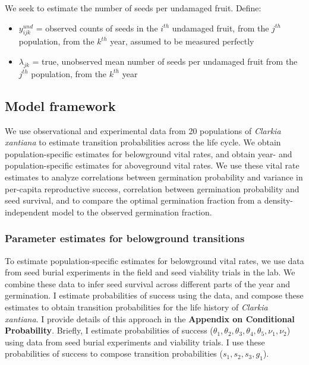 \documentclass[12pt, oneside, titlepage]{article}   	%
\begin{document}
We seek to estimate the number of seeds per undamaged fruit. Define:

\begin{itemize}
	\item $y^{und}_{ijk}$ = observed counts of seeds in the $i^{th}$ undamaged fruit, from the $j^{th}$ population, from the $k^{th}$ year, assumed to be measured perfectly
	\item $\lambda_{jk}$ = true, unobserved mean number of seeds per undamaged fruit from the $j^{th}$ population, from the $k^{th}$ year
\end{itemize}

\subsection*{Model framework}

We use observational and experimental data from 20 populations of \textit{Clarkia xantiana} to estimate transition probabilities across the life cycle. We obtain population-specific estimates for belowground vital rates, and obtain year- and population-specific estimates for aboveground vital rates. We use these vital rate estimates to analyze correlations between germination probability and variance in per-capita reproductive success, correlation between germination probability and seed survival, and to compare the optimal germination fraction from a density-independent model to the observed germination fraction. 

\subsubsection*{Parameter estimates for belowground transitions}

To estimate population-specific estimates for belowground vital rates, we use data from seed burial experiments in the field and seed viability trials in the lab. We combine these data to infer seed survival across different parts of the year and germination. I estimate probabilities of success using the data, and compose these estimates to obtain transition probabilities for the life history of \textit{Clarkia xantiana}. I provide details of this approach in the \textbf{Appendix on Conditional Probability}. Briefly, I estimate probabilities of success ($\theta_1, \theta_2, \theta_3, \theta_4, \theta_5, \nu_1, \nu_2$) using data from seed burial experiments and viability trials. I use these probabilities of success to compose transition probabilities ($s_1, s_2, s_3, g_1$).
\end{document}
